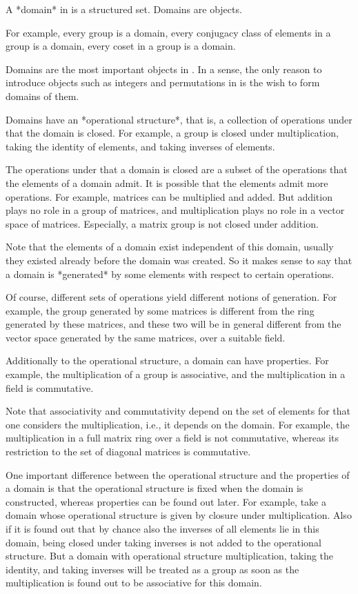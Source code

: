 
A *domain* in {\GAP} is a structured set.
Domains are objects.

For example, every group is a domain, every conjugacy class of elements
in a group is a domain, every coset in a group is a domain.

Domains are the most important objects in {\GAP}.
In a sense, the only reason to introduce objects such as integers and
permutations in {\GAP} is the wish to form domains of them.

Domains have an *operational structure*,
that is, a collection of operations under that the domain is closed.
For example, a group is closed under multiplication,
taking the identity of elements, and taking inverses of elements.

The operations under that a domain is closed are a subset of
the operations that the elements of a domain admit.
It is possible that the elements admit more operations.
For example, matrices can be multiplied and added.
But addition plays no role in a group of matrices,
and multiplication plays no role in a vector space of matrices.
Especially, a matrix group is not closed under addition.

Note that the elements of a domain exist independent of this domain,
usually they existed already before the domain was created.
So it makes sense to say that a domain is *generated* by some elements
with respect to certain operations.

Of course, different sets of operations yield different notions of
generation.
For example, the group generated by some matrices is different from
the ring generated by these matrices, and these two will be in general
different from the vector space generated by the same matrices,
over a suitable field.

Additionally to the operational structure,
a domain can have properties.
For example, the multiplication of a group is associative,
and the multiplication in a field is commutative.

Note that associativity and commutativity depend on the set of
elements for that one considers the multiplication,
i.e., it depends on the domain.
For example, the multiplication in a full matrix ring over a field
is not commutative, whereas its restriction to the set of diagonal
matrices is commutative.

One important difference between the operational structure and the
properties of a domain is that the operational structure is fixed when
the domain is constructed, whereas properties can be found out later.
For example, take a domain whose operational structure is given by
closure under multiplication.
Also if it is found out that by chance also the inverses of all elements
lie in this domain,
being closed under taking inverses is not added to the operational
structure.
But a domain with operational structure multiplication,
taking the identity, and taking inverses
will be treated as a group as soon as the multiplication is found out to
be associative for this domain.

